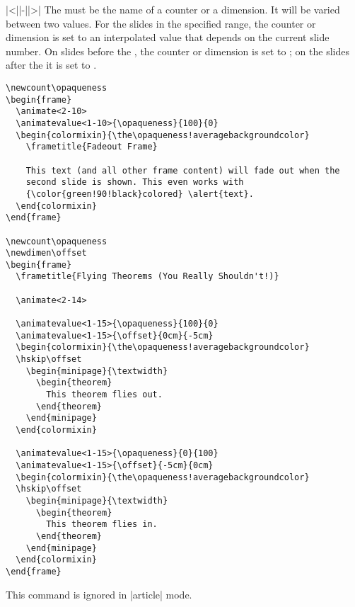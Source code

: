 \begin{command}{\animatevalue|<||-||>|%
    }
  The  must be the name of a counter or a dimension.
  It will be varied between two values. For the slides in the
  specified range, the counter or dimension is set to an interpolated
  value that depends on the current slide number. On slides before the
  , the counter or dimension is set to ; on the slides after the  it is set to
  .
  \example
\begin{verbatim}
\newcount\opaqueness
\begin{frame}
  \animate<2-10>
  \animatevalue<1-10>{\opaqueness}{100}{0}
  \begin{colormixin}{\the\opaqueness!averagebackgroundcolor}
    \frametitle{Fadeout Frame}

    This text (and all other frame content) will fade out when the
    second slide is shown. This even works with
    {\color{green!90!black}colored} \alert{text}.
  \end{colormixin}
\end{frame}

\newcount\opaqueness
\newdimen\offset
\begin{frame}
  \frametitle{Flying Theorems (You Really Shouldn't!)}

  \animate<2-14>

  \animatevalue<1-15>{\opaqueness}{100}{0}
  \animatevalue<1-15>{\offset}{0cm}{-5cm}
  \begin{colormixin}{\the\opaqueness!averagebackgroundcolor}
  \hskip\offset
    \begin{minipage}{\textwidth}
      \begin{theorem}
        This theorem flies out.
      \end{theorem}
    \end{minipage}
  \end{colormixin}

  \animatevalue<1-15>{\opaqueness}{0}{100}
  \animatevalue<1-15>{\offset}{-5cm}{0cm}
  \begin{colormixin}{\the\opaqueness!averagebackgroundcolor}
  \hskip\offset
    \begin{minipage}{\textwidth}
      \begin{theorem}
        This theorem flies in.
      \end{theorem}
    \end{minipage}
  \end{colormixin}
\end{frame}
\end{verbatim}

  \articlenote
  This command is ignored in |article| mode.
\end{command}

